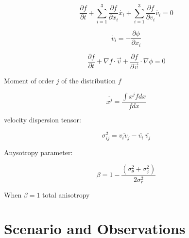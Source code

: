 \begin{equation}
\frac{\partial f}{\partial t}+\sum_{i=1}^{3}\frac{\partial f}{\partial x_{i}}\dot{x_{i}}+\sum_{i=1}^{3}\frac{\partial f}{\partial v_{i}}\dot{v_{i}}=0
\end{equation}


\begin{equation}
\dot{v_{i}}=-\frac{\partial\phi}{\partial x_{i}}
\end{equation}

\begin{equation}
\frac{\partial f}{\partial t}+\nabla f\cdot\vec{v}+\frac{\partial f}{\partial\overrightarrow{v}}\cdot\nabla\phi=0
\end{equation}

Moment of order $j$ of the distribution $f$

\begin{equation}
\overline{x^{j}}=\frac{\int x^{j}fdx}{fdx}
\end{equation}

velocity dispersion tensor:

\begin{equation}
\sigma_{ij}^{2}=\overline{v_{i}v_{j}}-\overline{v_{i}}\:\overline{v_{j}}
\end{equation}

Anysotropy parameter:

\begin{equation}
\beta=1-\frac{\left(\sigma_{\theta}^{2}+\sigma_{\phi}^{2}\right)}{2\sigma_{r}^{2}}
\end{equation}

When $\beta=1$ total anisotropy

\section{Scenario and Observations}

